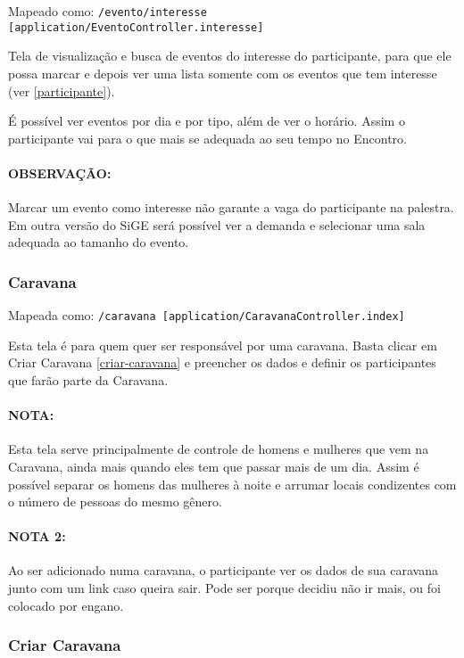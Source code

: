 Mapeado como:
\texttt{/evento/interesse {[}application/EventoController.interesse{]}}

Tela de visualização e busca de eventos do interesse do participante,
para que ele possa marcar e depois ver uma lista somente com os eventos
que tem interesse (ver \ref{participante}).

É possível ver eventos por dia e por tipo, além de ver o horário. Assim
o participante vai para o que mais se adequada ao seu tempo no Encontro.

\paragraph{OBSERVAÇÃO:}

Marcar um evento como interesse não garante a vaga do participante na
palestra. Em outra versão do SiGE será possível ver a demanda e
selecionar uma sala adequada ao tamanho do evento.

\subsubsection{Caravana \label{caravana}}

Mapeada como:
\texttt{/caravana {[}application/CaravanaController.index{]}}

Esta tela é para quem quer ser responsável por uma caravana. Basta
clicar em Criar Caravana \ref{criar-caravana} e preencher os dados e
definir os participantes que farão parte da Caravana.

\paragraph{NOTA:}

Esta tela serve principalmente de controle de homens e mulheres que vem
na Caravana, ainda mais quando eles tem que passar mais de um dia. Assim
é possível separar os homens das mulheres à noite e arrumar locais
condizentes com o número de pessoas do mesmo gênero.

\paragraph{NOTA 2:}

Ao ser adicionado numa caravana, o participante ver os dados de sua
caravana junto com um link caso queira sair. Pode ser porque decidiu não
ir mais, ou foi colocado por engano.

\subsubsection{Criar Caravana \label{criar-caravana}}

